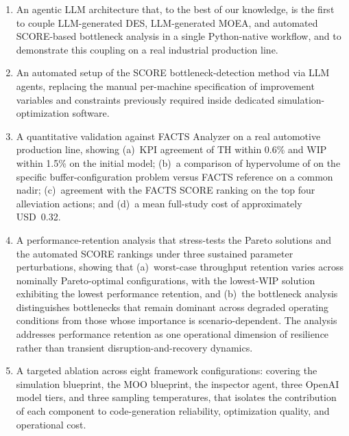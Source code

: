 \documentclass[a4paper,fleqn]{cas-sc}
\begin{document}
  \begin{enumerate}                                                                                                     
    \item An agentic LLM architecture that, to the best of our knowledge, is the first to couple LLM-generated DES, LLM-generated MOEA, and automated SCORE-based bottleneck analysis in a single Python-native workflow, and to demonstrate this coupling on a real industrial production line.                            
    \item An automated setup of the SCORE bottleneck-detection method \citep{Bernedixen2015} via LLM agents, replacing the manual per-machine specification of improvement variables and constraints previously required inside dedicated simulation-optimization software.                                                                             
    \item A quantitative validation against FACTS Analyzer on a real automotive production line, showing (a)~KPI agreement of TH within 0.6\% and WIP within 1.5\% on the initial model; (b)~a comparison of hypervolume of on the specific buffer-configuration problem versus FACTS reference on a common nadir; (c)~agreement with the FACTS SCORE ranking on the top four alleviation actions; and (d)~a mean full-study cost of approximately USD~0.32.                                                         
    \item A performance-retention analysis that stress-tests the Pareto solutions and the automated SCORE rankings under three sustained parameter perturbations, showing that (a)~worst-case throughput retention varies across nominally Pareto-optimal configurations, with the lowest-WIP solution exhibiting the lowest performance retention, and (b)~the bottleneck analysis distinguishes bottlenecks that remain dominant across degraded operating conditions from those whose importance is scenario-dependent. The analysis addresses performance retention as one operational dimension of resilience rather than transient disruption-and-recovery dynamics.                                                                             
    \item A targeted ablation across eight framework configurations: covering the simulation blueprint, the MOO blueprint, the inspector agent, three OpenAI model tiers, and three sampling temperatures, that isolates the contribution of each component to code-generation reliability, optimization quality, and operational cost.                                                                                
  \end{enumerate}      
\end{document}
